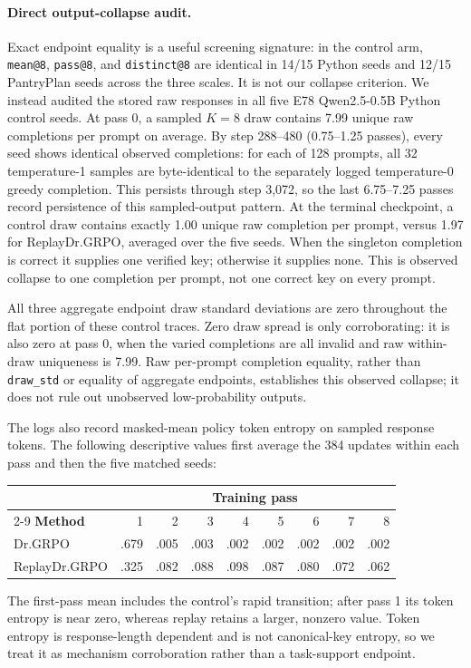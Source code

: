 \paragraph{Direct output-collapse audit.}
Exact endpoint equality is a useful screening signature: in the control arm,
\texttt{mean@8}, \texttt{pass@8}, and \texttt{distinct@8} are identical in
14/15 Python seeds and 12/15 PantryPlan seeds across the three scales. It is not
our collapse criterion. We instead audited the stored raw responses in all five
E78 Qwen2.5-0.5B Python control seeds. At pass 0, a sampled \(K=8\) draw contains
7.99 unique raw completions per prompt on average. By step 288--480
(0.75--1.25 passes), every seed shows identical observed completions: for each
of 128 prompts, all 32 temperature-1 samples are byte-identical to the
separately logged temperature-0 greedy completion. This persists through step 3,072, so the last
6.75--7.25 passes record persistence of this sampled-output pattern. At the
terminal checkpoint, a control draw contains exactly 1.00 unique raw completion
per prompt, versus 1.97 for ReplayDr.GRPO, averaged over the five seeds. When the
singleton completion is correct it supplies one verified key; otherwise it
supplies none. This is observed collapse to one completion per prompt, not one
correct key on every prompt.

All three aggregate endpoint draw standard deviations are zero throughout the
flat portion of these control traces. Zero draw spread is only corroborating:
it is also zero at pass 0, when the varied completions are all invalid and raw
within-draw uniqueness is 7.99. Raw per-prompt completion equality, rather than
\texttt{draw\_std} or equality of aggregate endpoints, establishes this
observed collapse; it does not rule out unobserved low-probability outputs.

The logs also record masked-mean policy token entropy on sampled response tokens.
The following descriptive values first average the 384 updates within each pass
and then the five matched seeds:
\begin{center}
\scriptsize
\begin{tabular}{@{}lrrrrrrrr@{}}
\toprule
& \multicolumn{8}{c}{\textbf{Training pass}} \\
\cmidrule(l){2-9}
\textbf{Method} & 1 & 2 & 3 & 4 & 5 & 6 & 7 & 8 \\
\midrule
Dr.GRPO & .679 & .005 & .003 & .002 & .002 & .002 & .002 & .002 \\
ReplayDr.GRPO & .325 & .082 & .088 & .098 & .087 & .080 & .072 & .062 \\
\bottomrule
\end{tabular}
\end{center}
The first-pass mean includes the control's rapid transition; after pass 1 its
token entropy is near zero, whereas replay retains a larger, nonzero value.
Token entropy is response-length dependent and is not canonical-key entropy, so
we treat it as mechanism corroboration rather than a task-support endpoint.

